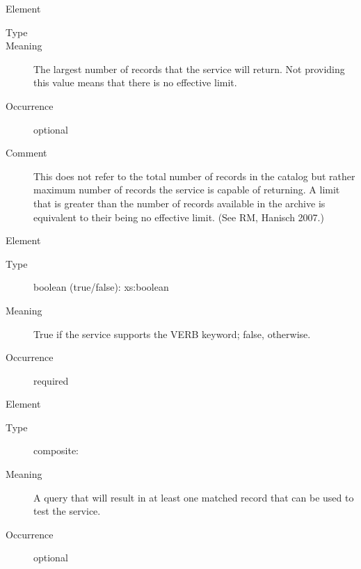 \documentclass[11pt,a4paper]{ivoa}
\begin{document}
\begin{generated}
\begin{bigdescription}
\begin{description}
\end{description}
\item[Element \xmlel{maxRecords}]
\begin{description}
\item[Type] 
\item[Meaning] 
                        The largest number of records that the service will 
                        return.  Not providing this value means that
                        there is no effective limit.  
                     
\item[Occurrence] optional
\item[Comment] 
                        This does not refer to the total number of records in 
                        the catalog but rather maximum number of records the 
                        service is capable of returning.  A limit that is 
                        greater than the number of records available in the 
                        archive is equivalent to their being no effective 
                        limit.  (See RM, Hanisch 2007.)
                     

\end{description}
\item[Element \xmlel{verbosity}]
\begin{description}
\item[Type] boolean (true/false): xs:boolean
\item[Meaning] 
                        True if the service supports the VERB keyword; 
                        false, otherwise.
                     
\item[Occurrence] required

\end{description}
\item[Element \xmlel{testQuery}]
\begin{description}
\item[Type] composite: 
\item[Meaning] 
                        A query that will result in at least one
                        matched record that can be used to test the
                        service.  
                     
\item[Occurrence] optional

\end{description}


\end{bigdescription}\endgroup

\endgroup
\end{generated}
\end{document}
